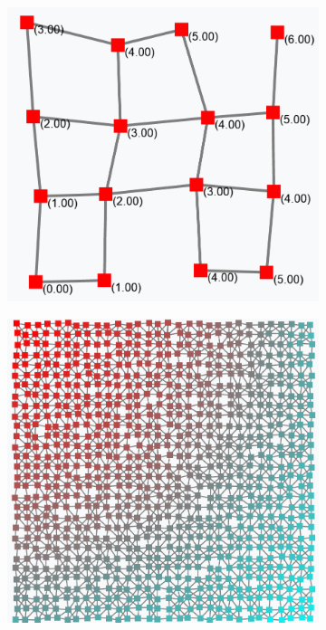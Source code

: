 \begin{figure}
    \centering
    \begin{subfigure}{0.4\textwidth}
        \includegraphics[width=\textwidth]{chapters/img/gradient-sparse.png}
        \caption{}\label{fig:gradient-sparse}
    \end{subfigure}
    \begin{subfigure}{0.4\textwidth}
        \includegraphics[width=\textwidth]{chapters/img/gradient-full.png}

\end{subfigure}
\end{figure}
